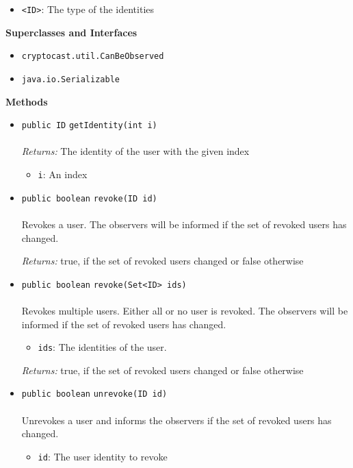 \begin{itemize}
\item \lstinline|<ID>|: The type of the identities
\end{itemize}


\textbf{\sffamily Superclasses and Interfaces}
\begin{itemize}
\item \lstinline|cryptocast.util.CanBeObserved|
\item \lstinline|java.io.Serializable|
\end{itemize}



\textbf{\sffamily Methods}
\begin{itemize}
\item \lstinline|public ID| \lstinline|getIdentity|\lstinline|(int i)|\\ \\[-0.6em]
\emph{Returns:} The identity of the user with the given index
\begin{itemize}
\item \lstinline|i|: An index
\end{itemize}



\item \lstinline|public boolean| \lstinline|revoke|\lstinline|(ID id)|\\ \\[-0.6em]
Revokes a user.
 The observers will be informed if the set of revoked
 users has changed.

\emph{Returns:} true, if the set of revoked users changed or false otherwise

\item \lstinline|public boolean| \lstinline|revoke|\lstinline|(Set<ID> ids)|\\ \\[-0.6em]
Revokes multiple users. Either all or no user is revoked.
 The observers will be informed if the set of revoked
 users has changed.
\begin{itemize}
\item \lstinline|ids|: The identities of the user.
\end{itemize}

\emph{Returns:} true, if the set of revoked users changed or false otherwise

\item \lstinline|public boolean| \lstinline|unrevoke|\lstinline|(ID id)|\\ \\[-0.6em]
Unrevokes a user and informs the observers if the set
 of revoked users has changed.
\begin{itemize}
\item \lstinline|id|: The user identity to revoke
\end{itemize}


\end{itemize}
